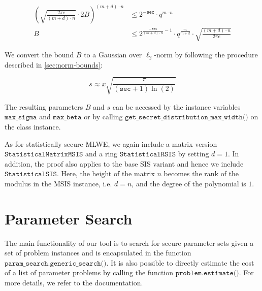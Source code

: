 
\begin{align}
    \left(\sqrt{\frac{2 \pi e}{(m+d) \cdot n}} \cdot 2 B\right)^{(m+d) \cdot n} & \leq 2^{-\texttt{sec}} \cdot q^{m\cdot n}                                                                       \\
    B                                                                           & \leq 2^{\frac{-\texttt{sec}}{(m+d)\cdot n} - 1} \cdot q^\frac{m}{m+d} \cdot \sqrt{\frac{(m+d)\cdot n}{2 \pi e}}
\end{align}

We convert the bound $B$ to a Gaussian over $\ell_2$-norm by following the procedure described in \cref{sec:norm-bounds}: %

\begin{equation}
    s  \approx x \sqrt{\frac{\pi}{(\texttt{sec} + 1) \ln(2)}}
\end{equation}

The resulting parameters $B$ and $s$ can be accessed by the instance variables $\texttt{max\_sigma}$ and $\texttt{max\_beta}$ or by calling $\texttt{get\_secret\_distribution\_max\_width()}$ on the class instance.

As for statistically secure MLWE, we again include a matrix version $\texttt{StatisticalMatrixMSIS}$ and a ring $\texttt{StatisticalRSIS}$ by setting $d=1$. In addition, the proof also applies to the base SIS variant and hence we include $\texttt{StatisticalSIS}$. Here, the height of the matrix $n$ becomes the rank of the modulus in the MSIS instance, i.e. $d=n$, and the degree of the polynomial is $1$.



\section{Parameter Search}
The main functionality of our tool is to search for secure parameter sets given a set of problem instances and is encapsulated in the function $\texttt{param\_search.generic\_search()}$. It is also possible to directly estimate the cost of a list of parameter problems by calling the function $\texttt{problem.estimate()}$. For more details, we refer to the documentation.

